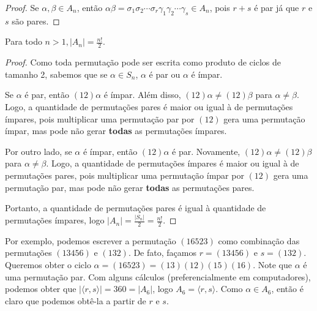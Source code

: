 	\begin{proof}
	Se $\alpha, \beta \in A_n$, então $\alpha\beta = \sigma_1\sigma_2\cdots\sigma_r\gamma_1\gamma_2\cdots\gamma_s \in A_n$, pois $r+s$ é par já que $r$ e $s$ são pares. \end{proof}
	\begin{theorem}
		\label{ordem do grupo alternante}
		Para todo $n>1, |A_n| = \displaystyle{\frac{n!}{2}}$.\end{theorem}
	\begin{proof}
		Como toda permutação pode ser escrita como produto de ciclos de tamanho 2, sabemos que se $\alpha\in S_n$, $\alpha$ é par ou $\alpha$ é ímpar. 
		\par\vspace{0.3cm} Se $\alpha$ é par, então $(12)\alpha$ é ímpar. Além disso, $(12)\alpha\neq (12)\beta$ para $\alpha\neq\beta$. Logo, a quantidade de permutações pares é maior ou igual à de permutações ímpares, pois multiplicar uma permutação par por $(12)$ gera uma permutação ímpar, mas pode não gerar \textbf{todas} as permutações ímpares.
		\par\vspace{0.3cm} Por outro lado, se $\alpha$ é ímpar, então $(12)\alpha$ é par. Novamente, $(12)\alpha\neq (12)\beta$ para $\alpha\neq\beta$. Logo, a quantidade de permutações ímpares é maior ou igual à de permutações pares, pois multiplicar uma permutação ímpar por $(12)$ gera uma permutação par, mas pode não gerar \textbf{todas} as permutações pares. 
		\par\vspace{0.3cm} Portanto, a quantidade de permutações pares é igual à quantidade de permutações ímpares, logo $|A_n| = \displaystyle{\frac{|S_n|}{2} = \frac{n!}{2} }$. \end{proof} 
	
	
	\par\vspace{0.3cm} Por exemplo, podemos escrever a permutação $(16523)$ como combinação das permutações $(13456)$ e $(132)$. De fato, façamos $r = (13456)$ e $s = (132)$. Queremos obter o ciclo $\alpha = (16523) = (13)(12)(15)(16)$. Note que $\alpha$ é uma permutação par. Com alguns cálculos (preferencialmente em computadores), podemos obter que $|\langle r,s \rangle| = 360 = |A_6|$, logo $A_6 = \langle r,s \rangle$. Como $\alpha\in A_6$, então é claro que podemos obtê-la a partir de $r$ e $s$.

